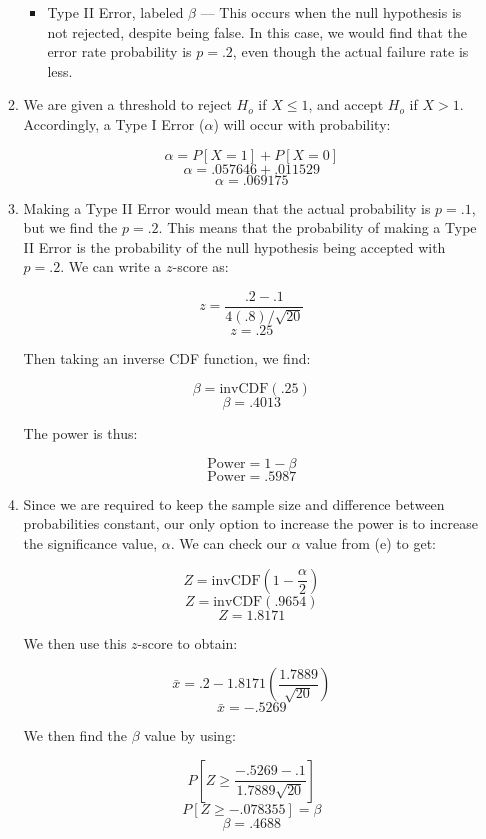 \begin{enumerate}
\begin{enumerate}
\begin{itemize}
          \item Type II Error, labeled $\beta$ — This occurs when the null hypothesis is not rejected, despite being false. In this case, we would find that the error rate probability is $p=.2$, even though the actual failure rate is less.

        \end{itemize}

      \item We are given a threshold to reject $H_o$ if $X\leq 1$, and accept $H_o$ if $X>1$. Accordingly, a Type I Error ($\alpha$) will occur with probability:

        $$\alpha = P[X=1]+P[X=0]$$
        $$\alpha = .057646+.011529$$
        $$\boxed{\alpha = .069175}$$

      \item Making a Type II Error would mean that the actual probability is $p=.1$, but we find the $p=.2$. This means that the probability of making a Type II Error is the probability of the null hypothesis being accepted with $p=.2$. We can write a $z$-score as:

        $$z=\frac{.2-.1}{4(.8)/\sqrt{20}}$$
        $$z=.25$$

        Then taking an inverse CDF function, we find:

        $$\beta=\text{invCDF}(.25)$$
        $$\boxed{\beta=.4013}$$

        The power is thus:

        $$\text{Power}=1-\beta$$
        $$\boxed{\text{Power}=.5987}$$

      \item Since we are required to keep the sample size and difference between probabilities constant, our only option to increase the power is to increase the significance value, $\alpha$. We can check our $\alpha$ value from (e) to get:

        $$Z=\text{invCDF}\left(1-\frac{\alpha}{2}\right)$$
        $$Z=\text{invCDF}(.9654)$$
        $$Z=1.8171$$

        We then use this $z$-score to obtain:

        $$\bar{x}=.2-1.8171\left( \frac{1.7889}{\sqrt{20}} \right)$$
        $$\bar{x}=-.5269$$

        We then find the $\beta$ value by using:

        $$P\left[ Z\geq \frac{-.5269-.1}{1.7889\sqrt{20}} \right]$$
        $$P\left[ Z\geq -.078355 \right]=\beta$$
        $$\boxed{\beta=.4688}$$


\end{enumerate}
\end{enumerate}
